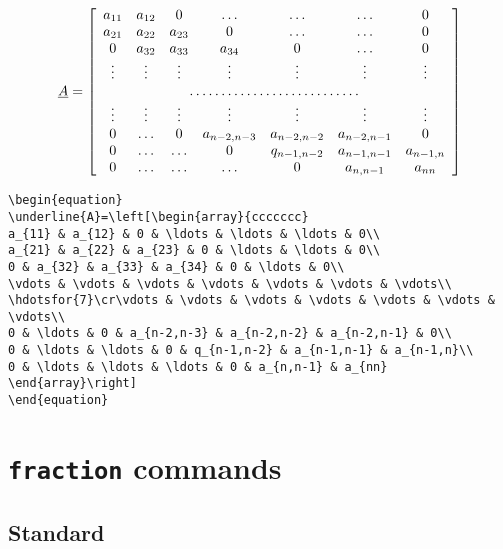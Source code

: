 \begin{table}[htb]
\begin{equation}
\underline{A}=\left[\begin{array}{ccccccc}
a_{11} & a_{12} & 0 & \ldots & \ldots & \ldots & 0\\
a_{21} & a_{22} & a_{23} & 0 & \ldots & \ldots & 0\\
0 & a_{32} & a_{33} & a_{34} & 0 & \ldots & 0\\
\vdots & \vdots & \vdots & \vdots & \vdots & \vdots & \vdots\\
\hdotsfor{7}\cr\vdots & \vdots & \vdots & \vdots & \vdots & \vdots & \vdots\\
0 & \ldots & 0 & a_{n-2,n-3} & a_{n-2,n-2} & a_{n-2,n-1} & 0\\
0 & \ldots & \ldots & 0 & q_{n-1,n-2} & a_{n-1,n-1} & a_{n-1,n}\\
0 & \ldots & \ldots & \ldots & 0 & a_{n,n-1} & a_{nn}
\end{array}\right]\label{eq:tridiagonal}
\end{equation}

\begin{lstlisting}[xleftmargin=-1cm,xrightmargin=-1.5cm]
\begin{equation}
\underline{A}=\left[\begin{array}{ccccccc}
a_{11} & a_{12} & 0 & \ldots & \ldots & \ldots & 0\\
a_{21} & a_{22} & a_{23} & 0 & \ldots & \ldots & 0\\
0 & a_{32} & a_{33} & a_{34} & 0 & \ldots & 0\\
\vdots & \vdots & \vdots & \vdots & \vdots & \vdots & \vdots\\
\hdotsfor{7}\cr\vdots & \vdots & \vdots & \vdots & \vdots & \vdots & \vdots\\
0 & \ldots & 0 & a_{n-2,n-3} & a_{n-2,n-2} & a_{n-2,n-1} & 0\\
0 & \ldots & \ldots & 0 & q_{n-1,n-2} & a_{n-1,n-1} & a_{n-1,n}\\
0 & \ldots & \ldots & \ldots & 0 & a_{n,n-1} & a_{nn}
\end{array}\right]
\end{equation}
\end{lstlisting}


\section{\texttt{fraction} commands}\label{sec:ams-fraction}


\subsection{Standard}


\end{table}

